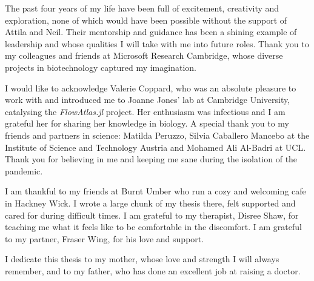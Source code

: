 \begin{acknowledgements}
    The past four years of my life have been full of excitement, creativity and exploration, none of which would have been possible without the support of Attila and Neil. Their mentorship and guidance has been a shining example of leadership and whose qualities I will take with me into future roles. Thank you to my colleagues and friends at Microsoft Research Cambridge, whose diverse projects in biotechnology captured my imagination.

    I would like to acknowledge Valerie Coppard, who was an absolute pleasure to work with and introduced me to Joanne Jones' lab at Cambridge University, catalysing the \emph{FlowAtlas.jl} project. Her enthusiasm was infectious and I am grateful her for sharing her knowledge in biology. A special thank you to my friends and partners in science: Matilda Peruzzo, Silvia Caballero Mancebo at the Institute of Science and Technology Austria and Mohamed Ali Al-Badri at UCL. Thank you for believing in me and keeping me sane during the isolation of the pandemic.

    I am thankful to my friends at Burnt Umber who run a cozy and welcoming cafe in Hackney Wick. I wrote a large chunk of my thesis there, felt supported and cared for during difficult times. I am grateful to my therapist, Disree Shaw, for teaching me what it feels like to be comfortable in the discomfort. I am grateful to my partner, Fraser Wing, for his love and support. 
    
    I dedicate this thesis to my mother, whose love and strength I will always remember, and to my father, who has done an excellent job at raising a doctor.

\end{acknowledgements}


\setcounter{tocdepth}{2} 

\tableofcontents
\listoffigures